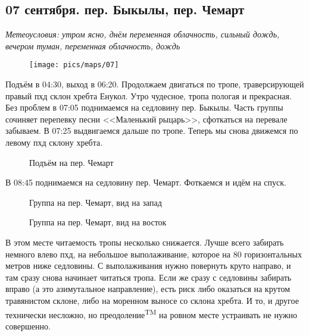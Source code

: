 \subsection{07 сентября. пер. Быкылы, пер. Чемарт}
\textit{Метеоусловия: утром ясно, днём переменная облачность, сильный дождь, вечером туман, переменная облачность, дождь}

\begin{figure}[h!]
	\centering
	\texttt{[image: pics/maps/07]}
	\label{fig:07}
\end{figure}

Подъём в 04:30, выход в 06:20. Продолжаем двигаться по тропе, траверсирующей правый пхд склон хребта Енукол. Утро чудесное, тропа пологая и прекрасная. Без проблем в 07:05 поднимаемся на седловину пер. Быкылы. Часть группы сочиняет перепевку песни <<Маленький рыцарь>>, сфоткаться на перевале забываем. В 07:25 выдвигаемся дальше по тропе. Теперь мы снова движемся по левому пхд склону хребта.

\begin{figure}[h!]
	\centering
	\caption{Подъём на пер. Чемарт}
	\label{fig:toward_chemart}
\end{figure}

В 08:45 поднимаемся на седловину пер. Чемарт. Фоткаемся и идём на спуск.

\begin{figure}[h!]
	\centering
	\caption{Группа на пер. Чемарт, вид на запад}
	\label{fig:chemart_west}
\end{figure}


\begin{figure}[h!]
	\centering
	\caption{Группа на пер. Чемарт, вид на восток}
	\label{fig:chemart_east}
\end{figure}


В этом месте читаемость тропы несколько снижается. Лучше всего забирать немного влево пхд, на небольшое выполаживание, которое на 80 горизонтальных метров ниже седловины. С выполаживания нужно повернуть круто направо, и там сразу снова начинает читаться тропа. Если же сразу с седловины забирать вправо (а это азимутальное направление), есть риск либо оказаться на крутом травянистом склоне, либо на моренном выносе со склона хребта. И то, и другое технически несложно, но преодоление\textsuperscript{TM} на ровном месте устраивать не нужно совершенно.

